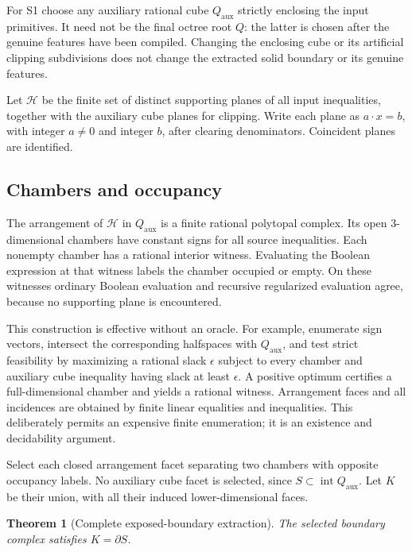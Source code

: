 \documentclass[11pt]{article}
\newtheorem{theorem}{Theorem}[section]
\theoremstyle{definition}
\theoremstyle{remark}
\newcommand{\intr}{\operatorname{int}}
\begin{document}
For S1 choose any auxiliary rational cube $Q_{\mathrm{aux}}$ strictly
enclosing the input primitives. It need not be the final octree root $Q$:
the latter is chosen after the genuine features have been compiled.
Changing the enclosing cube or its artificial clipping subdivisions
does not change the extracted solid boundary or its genuine features.

Let $\mathcal H$ be the finite set of distinct supporting planes of all
input inequalities, together with the auxiliary cube planes for clipping.
Write each plane as $a\cdot x=b$, with integer $a\ne0$ and integer $b$,
after clearing denominators. Coincident planes are identified.

\subsection{Chambers and occupancy}

The arrangement of $\mathcal H$ in $Q_{\mathrm{aux}}$ is a finite rational polytopal
complex. Its open $3$-dimensional chambers have constant signs for all
source inequalities. Each nonempty chamber has a rational interior witness.
Evaluating the Boolean expression at that witness labels the chamber
occupied or empty. On these witnesses ordinary Boolean evaluation and
recursive regularized evaluation agree, because no supporting plane is
encountered.

This construction is effective without an oracle. For example, enumerate
sign vectors, intersect the corresponding halfspaces with $Q_{\mathrm{aux}}$, and test
strict feasibility by maximizing a rational slack $\epsilon$ subject to
every chamber and auxiliary cube inequality having slack at least $\epsilon$.
A positive optimum certifies a full-dimensional chamber and yields a
rational witness. Arrangement faces and all incidences are obtained by
finite linear equalities and inequalities. This deliberately permits an
expensive finite enumeration; it is an existence and decidability argument.

Select each closed arrangement facet separating two chambers with
opposite occupancy labels. No auxiliary cube facet is selected, since
$S\subset\intr Q_{\mathrm{aux}}$.
Let $K$ be their union, with all their induced lower-dimensional faces.

\begin{theorem}[Complete exposed-boundary extraction]
\label{thm:arrangement-boundary}
The selected boundary complex satisfies $K=\partial S$.
\end{theorem}
\end{document}
